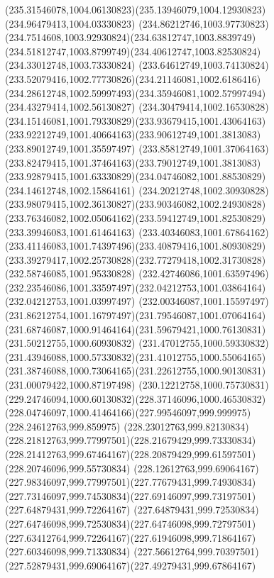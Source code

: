 {    \curveto(235.31546078,1004.06130823)(235.13946079,1004.12930823)(234.96479413,1004.03330823)
    \curveto(234.86212746,1003.97730823)(234.7514608,1003.92930824)(234.63812747,1003.8839749)
    \curveto(234.51812747,1003.8799749)(234.40612747,1003.82530824)(234.33012748,1003.73330824)
    \curveto(233.64612749,1003.74130824)(233.52079416,1002.77730826)(234.21146081,1002.6186416)
    \curveto(234.28612748,1002.59997493)(234.35946081,1002.57997494)(234.43279414,1002.56130827)
    \curveto(234.30479414,1002.16530828)(234.15146081,1001.79330829)(233.93679415,1001.43064163)
    \curveto(233.92212749,1001.40664163)(233.90612749,1001.3813083)(233.89012749,1001.35597497)
    \curveto(233.85812749,1001.37064163)(233.82479415,1001.37464163)(233.79012749,1001.3813083)
    \curveto(233.92879415,1001.63330829)(234.04746082,1001.88530829)(234.14612748,1002.15864161)
    \curveto(234.20212748,1002.30930828)(233.98079415,1002.36130827)(233.90346082,1002.24930828)
    \curveto(233.76346082,1002.05064162)(233.59412749,1001.82530829)(233.39946083,1001.61464163)
    \curveto(233.40346083,1001.67864162)(233.41146083,1001.74397496)(233.40879416,1001.80930829)
    \curveto(233.39279417,1002.25730828)(232.77279418,1002.31730828)(232.58746085,1001.95330828)
    \curveto(232.42746086,1001.63597496)(232.23546086,1001.33597497)(232.04212753,1001.03864164)
    \lineto(232.04212753,1001.03997497)
    \curveto(232.00346087,1001.15597497)(231.86212754,1001.16797497)(231.79546087,1001.07064164)
    \curveto(231.68746087,1000.91464164)(231.59679421,1000.76130831)(231.50212755,1000.60930832)
    \curveto(231.47012755,1000.59330832)(231.43946088,1000.57330832)(231.41012755,1000.55064165)
    \curveto(231.38746088,1000.73064165)(231.22612755,1000.90130831)(231.00079422,1000.87197498)
    \curveto(230.12212758,1000.75730831)(229.24746094,1000.60130832)(228.37146096,1000.46530832)
    \curveto(228.04746097,1000.41464166)(227.99546097,999.999975)(228.24612763,999.859975)
    \curveto(228.23012763,999.82130834)(228.21812763,999.77997501)(228.21679429,999.73330834)
    \curveto(228.21412763,999.67464167)(228.20879429,999.61597501)(228.20746096,999.55730834)
    \curveto(228.12612763,999.69064167)(227.98346097,999.77997501)(227.77679431,999.74930834)
    \curveto(227.73146097,999.74530834)(227.69146097,999.73197501)(227.64879431,999.72264167)
    \curveto(227.64879431,999.72530834)(227.64746098,999.72530834)(227.64746098,999.72797501)
    \curveto(227.63412764,999.72264167)(227.61946098,999.71864167)(227.60346098,999.71330834)
    \curveto(227.56612764,999.70397501)(227.52879431,999.69064167)(227.49279431,999.67864167)
}
